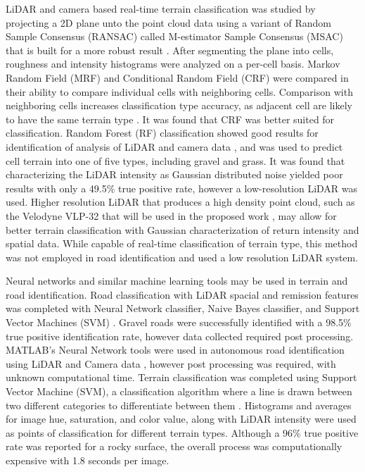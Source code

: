 \documentclass[numbered,pdftex]{ohio-etd}
\begin{document}
{{		{LiDAR and camera based real-time terrain classification was studied by projecting a 2D plane unto the point cloud data using a variant of Random Sample Consensus (RANSAC) called M-estimator Sample Consensus (MSAC) \cite{mijakovska_generating_2014} that is built for a more robust result \cite{laible_3d_2012,laible_map_building,laible_terrain_2013}. After segmenting the plane into cells, roughness and intensity histograms were analyzed on a per-cell basis. Markov Random Field (MRF) \cite{chellappa_classification_1985} and Conditional Random Field (CRF) \cite{wallach_conditional_nodate} were compared in their ability to compare individual cells with neighboring cells. Comparison with neighboring cells increases classification type accuracy, as adjacent cell are likely to have the same terrain type \cite{haselich_terrain_2011,zhao_fusion_2014}. It was found that CRF was better suited for classification.	Random Forest (RF) classification showed good results for identification of analysis of LiDAR and camera data \cite{breiman_random_2001}, and was used to predict cell terrain into one of five types, including gravel and grass. It was found that characterizing the LiDAR intensity as Gaussian distributed noise yielded poor results with only a 49.5\% true positive rate, however a low-resolution LiDAR was used. Higher resolution LiDAR that produces a high density point cloud, such as the Velodyne VLP-32 that will be used in the proposed work \cite{vlp_32c}, may allow for better terrain classification with Gaussian characterization of return intensity and spatial data. While capable of real-time classification of terrain type, this method was not employed in road identification and used a low resolution LiDAR system.}
		
		{Neural networks and similar machine learning tools may be used in terrain and road identification. Road classification with LiDAR spacial and remission features was completed with Neural Network classifier, Naive Bayes classifier, and Support Vector Machines (SVM) \cite{wang_road_nodate,wang_two-stage_2018}. Gravel roads were successfully identified with a 98.5\% true positive identification rate, however data collected required post processing. MATLAB's Neural Network tools were used in autonomous road identification using LiDAR and Camera data \cite{rasmussen_combining_2002}, however post processing was required, with unknown computational time.  Terrain classification was completed using Support Vector Machine (SVM), a classification algorithm where a line is drawn between two different categories to differentiate between them \cite{breiman_random_2001}. Histograms and averages for image hue, saturation, and color value, along with LiDAR intensity were used as points of classification for different terrain types. Although a 96\% true positive rate was reported for a rocky surface, the overall process was computationally expensive with 1.8 seconds per image. }
		
}}
\end{document}
